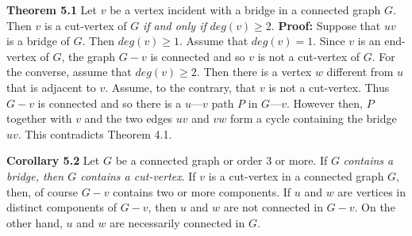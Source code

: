 \nopagenumbers
{\bf Theorem 5.1}
\vskip 6pt
Let $v$ be a vertex incident with a bridge in a connected graph $G$. Then $v$ is a cut-vertex of $G$ {\it if and only if} $deg(v) \geq 2$.
\vskip 10pt
{\bf Proof:}
\vskip 6pt
Suppose that $uv$ is a bridge of $G$. Then $deg(v) \geq 1$. Assume that $deg(v)=1$. Since $v$ is an end-vertex of $G$, the graph $G-v$ is connected and so $v$ is not a cut-vertex of $G$.
\vskip 1mm
For the converse, assume that $deg(v) \geq 2$. Then there is a vertex $w$ different from $u$ that is adjacent to $v$. Assume, to the contrary, that $v$ is not a cut-vertex. Thus $G-v$ is connected and so there is a $u$---$v$ path $P$ in $G$---$v$. However then, $P$ together with $v$ and the two edges $uv$ and $vw$ form a cycle containing the bridge $uv$. This contradicts Theorem 4.1.

\vskip 10pt
{\bf Corollary 5.2}
\vskip 6pt
Let $G$ be a connected graph or order $3$ or more. If $G$ {\it contains a bridge, then $G$ contains a cut-vertex}.
\vskip 10pt
If $v$ is a cut-vertex in a connected graph $G$, then, of course $G-v$ contains two or more components. If $u$ and $w$ are vertices in distinct components of $G-v$, then $u$ and $w$ are not connected in $G-v$. On the other hand, $u$ and $w$ are necessarily connected in $G$.


\vfill\eject
